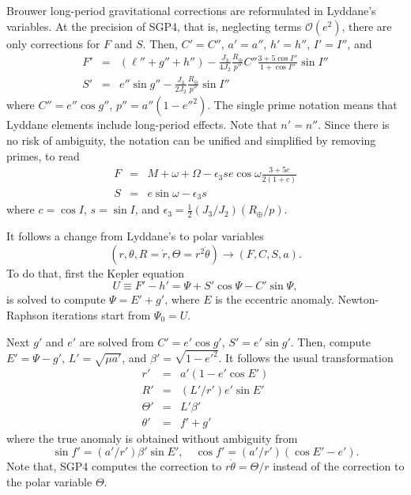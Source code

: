 \documentclass{article}
\begin{document}
Brouwer long-period gravitational corrections are reformulated in Lyddane's variables. At the precision of SGP4, that is, neglecting terms $\mathcal{O}(e^2)$, there are only corrections for $F$ and $S$. Then, $C'= C''$, $a'=a''$, $h'=h''$, $I'=I''$, and
\begin{eqnarray*}
F' &=& (\ell''+g''+h'')-\frac{J_3}{4J_2}\frac{R_\oplus}{p''}C''\frac{3+5\cos{I}''}{1+\cos{I}''}\sin{I}'' \\
S' &=&  e''\sin{g}'' -\frac{J_3}{2J_2}\frac{R_\oplus}{p''}\sin{I}''
\end{eqnarray*}
where $C''=e''\cos{g}''$, $p''=a''(1-e''^2)$. The single prime notation means that Lyddane elements include long-period effects. Note that $n'=n''$. Since there is no risk of ambiguity, the notation can be unified and simplified by removing primes, to read
\begin{eqnarray*}
F &=&  M + \omega + \Omega - \epsilon_3 s e \cos{\omega}\frac{3+5c}{2(1+c)} \\
S &=& e\sin{\omega} - \epsilon_3 s
\end{eqnarray*}
where $c=\cos{I}$, $s=\sin{I}$, and $\epsilon_3=\frac{1}{2}(J_3/J_2)(R_\oplus/p)$.

It follows a change from Lyddane's to polar variables
\[
(r,\theta,R=\dot{r},\Theta=r^2\dot\theta)\longrightarrow(F,C,S,a).
\]
To do that, first the Kepler equation
\[
U\equiv{F'-h'}=\Psi+S'\cos\Psi-C'\sin\Psi,
\]
is solved to compute $\Psi=E'+g'$, where $E$ is the eccentric anomaly. Newton-Raphson iterations start from $\Psi_0=U$.

Next $g'$ and $e'$ are solved from $C'=e'\cos{g'}$, $S'=e'\sin{g}'$. Then, compute $E'=\Psi-g'$, $L'=\sqrt{\mu{a}'}$, and $\beta'=\sqrt{1-e'^2}$. It follows the usual transformation
\begin{eqnarray} \label{eq:utor}
r' &=& a'(1-e'\cos{E}') \\
R' &=& (L'/r')e'\sin{E}' \\
\Theta' &=& L'\beta' \\
\theta' &=& f'+g'
\end{eqnarray}
where the true anomaly is obtained without ambiguity from
\begin{equation} \label{eq:utof}
\sin{f}'=(a'/r')\beta'\sin{E}',\quad \cos{f}'=(a'/r')(\cos{E}'-e').
\end{equation}
Note that, SGP4 computes the correction to $r\dot\theta=\Theta/r$ instead of the correction to the polar variable $\Theta$.
\end{document}
